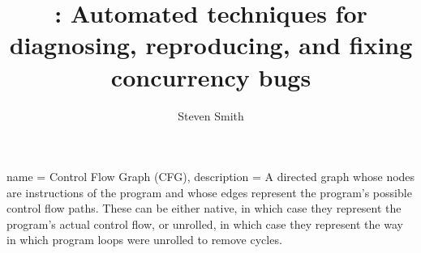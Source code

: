 {
  name = Control Flow Graph (CFG),
  description = {A directed graph whose nodes are instructions
    of the program and whose edges represent the program's possible
    control flow paths.  These can be either native, in which
    case they represent the program's actual control flow, or
    unrolled, in which case they represent the way in which program
    loops were unrolled to remove cycles.
  }
}

\makeglossaries

\author{Steven Smith}
\title{{\Technique}: Automated techniques for diagnosing, reproducing, and fixing concurrency bugs}
